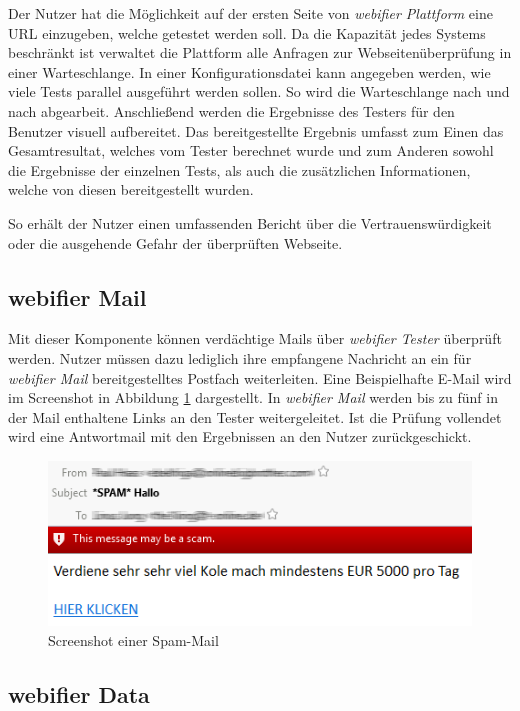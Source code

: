 Der Nutzer hat die Möglichkeit auf der ersten Seite von \textit{webifier Plattform} eine \acs{URL}
einzugeben, welche getestet werden soll. Da die Kapazität jedes Systems beschränkt ist verwaltet die
Plattform alle Anfragen zur Webseitenüberprüfung in einer Warteschlange. In einer
Konfigurationsdatei kann angegeben werden, wie viele Tests parallel ausgeführt werden sollen. So
wird die Warteschlange nach und nach abgearbeit. Anschließend werden die Ergebnisse des Testers für
den Benutzer visuell aufbereitet. Das bereitgestellte Ergebnis umfasst zum Einen das Gesamtresultat, welches vom Tester berechnet wurde und zum Anderen sowohl die Ergebnisse der einzelnen Tests, als auch die zusätzlichen Informationen, welche von diesen bereitgestellt wurden.

So erhält der Nutzer einen umfassenden Bericht über die Vertrauenswürdigkeit oder die ausgehende Gefahr der überprüften Webseite.

\subsection{webifier Mail}
Mit dieser Komponente können verdächtige Mails über \textit{webifier Tester} überprüft werden.
Nutzer müssen dazu lediglich ihre empfangene Nachricht an ein für \textit{webifier Mail}
bereitgestelltes Postfach weiterleiten. Eine Beispielhafte E-Mail wird im Screenshot in
Abbildung \ref{fig:spam-mail} dargestellt. In \textit{webifier Mail} werden bis zu fünf in der
Mail enthaltene Links an den Tester weitergeleitet. Ist die Prüfung vollendet wird eine Antwortmail
mit den Ergebnissen an den Nutzer zurückgeschickt.

\begin{figure}[H]
	\centering
	\includegraphics[width=12cm]{images/spam-mail.png}
	\caption{Screenshot einer Spam-Mail}
	\label{fig:spam-mail}
\end{figure}

\subsection{webifier Data}
\label{sec:konzept-data}

